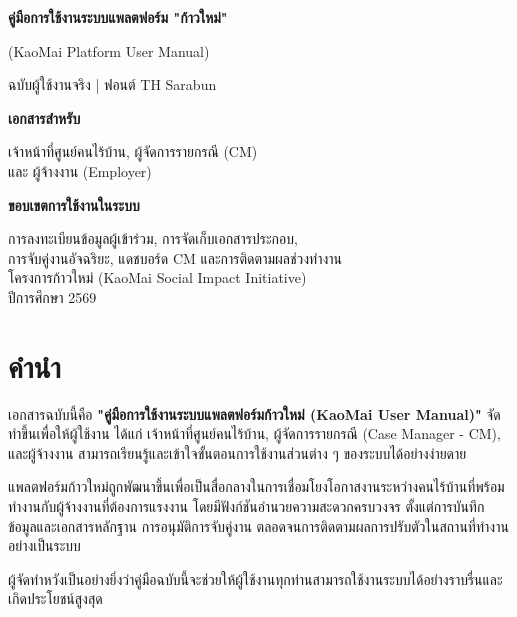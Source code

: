 \documentclass[12pt,a4paper]{report}
\begin{document}
\begin{titlepage}
    \centering
    \vspace*{2cm}
    {\LARGE \textbf{คู่มือการใช้งานระบบแพลตฟอร์ม "ก้าวใหม่"} \par}
    \vspace{0.5cm}
    {\Large (KaoMai Platform User Manual) \par}
    \vspace{0.3cm}
    {\large ฉบับผู้ใช้งานจริง | ฟอนต์ TH Sarabun \par}
    \vspace{2cm}
    {\large \textbf{เอกสารสำหรับ} \par}
    \vspace{0.5cm}
    เจ้าหน้าที่ศูนย์คนไร้บ้าน, ผู้จัดการรายกรณี (CM) \\
    และ ผู้จ้างงาน (Employer) \\
    \vspace{1.5cm}
    {\large \textbf{ขอบเขตการใช้งานในระบบ} \par}
    \vspace{0.5cm}
    การลงทะเบียนข้อมูลผู้เข้าร่วม, การจัดเก็บเอกสารประกอบ, \\
    การจับคู่งานอัจฉริยะ, แดชบอร์ด CM และการติดตามผลช่วงทำงาน \\
    \vfill
    {\large
    โครงการก้าวใหม่ (KaoMai Social Impact Initiative) \\
    ปีการศึกษา 2569
    }
\end{titlepage}


\chapter*{คำนำ}

เอกสารฉบับนี้คือ \textbf{"คู่มือการใช้งานระบบแพลตฟอร์มก้าวใหม่ (KaoMai User Manual)"} จัดทำขึ้นเพื่อให้ผู้ใช้งาน ได้แก่ เจ้าหน้าที่ศูนย์คนไร้บ้าน, ผู้จัดการรายกรณี (Case Manager - CM), และผู้จ้างงาน สามารถเรียนรู้และเข้าใจขั้นตอนการใช้งานส่วนต่าง ๆ ของระบบได้อย่างง่ายดาย

แพลตฟอร์มก้าวใหม่ถูกพัฒนาขึ้นเพื่อเป็นสื่อกลางในการเชื่อมโยงโอกาสงานระหว่างคนไร้บ้านที่พร้อมทำงานกับผู้จ้างงานที่ต้องการแรงงาน โดยมีฟังก์ชันอำนวยความสะดวกครบวงจร ตั้งแต่การบันทึกข้อมูลและเอกสารหลักฐาน การอนุมัติการจับคู่งาน ตลอดจนการติดตามผลการปรับตัวในสถานที่ทำงานอย่างเป็นระบบ

ผู้จัดทำหวังเป็นอย่างยิ่งว่าคู่มือฉบับนี้จะช่วยให้ผู้ใช้งานทุกท่านสามารถใช้งานระบบได้อย่างราบรื่นและเกิดประโยชน์สูงสุด
\end{document}
